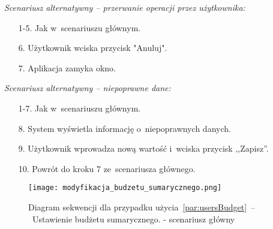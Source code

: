 \textit{Scenariusz alternatywny -- przerwanie operacji przez użytkownika:}
\begin{enumerate}
  \item[1-5.] Jak w~scenariuszu głównym.
  \item[6.] Użytkownik wciska przycisk "Anuluj".
  \item[7.] Aplikacja zamyka okno.
\end{enumerate}
\textit{Scenariusz alternatywny -- niepoprawne dane:}
\begin{enumerate}
  \item[1-7.] Jak w~scenariuszu głównym.
  \item[8.] System wyświetla informację o~niepoprawnych danych.
  \item[9.] Użytkownik wprowadza nową wartość i~wciska przycisk ,,Zapisz''.
  \item[10.] Powrót do kroku 7 ze~scenariusza głównego.
\end{enumerate}

\begin{figure}[H]
    \texttt{[image: modyfikacja\_budzetu\_sumarycznego.png]}
    \caption{Diagram sekwencji dla przypadku użycia~\ref{par:usersBudget}~--~Ustawienie budżetu sumarycznego.
    - scenariusz główny}
\end{figure}

